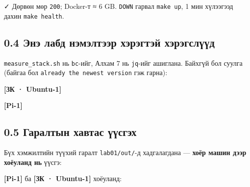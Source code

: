 ✓ Дөрвөн мөр \texttt{200}; Docker-т ≈ 6 GB. \texttt{DOWN} гарвал \texttt{make\ up}, 1 мин хүлээгээд дахин \texttt{make\ health}.

\hypertarget{ux44dux43dux44d-ux43bux430ux431ux434-ux43dux44dux43cux44dux43bux442ux44dux44dux440-ux445ux44dux440ux44dux433ux442ux44dux439-ux445ux44dux440ux44dux433ux441ux43bux4afux4afux434}{%
\subsection{0.4 Энэ лабд нэмэлтээр хэрэгтэй хэрэгслүүд}\label{ux44dux43dux44d-ux43bux430ux431ux434-ux43dux44dux43cux44dux43bux442ux44dux44dux440-ux445ux44dux440ux44dux433ux442ux44dux439-ux445ux44dux440ux44dux433ux441ux43bux4afux4afux434}}

\texttt{measure\_\allowbreak{}stack.\allowbreak{}sh} нь \texttt{bc}-ийг, Алхам 7 нь \texttt{jq}-ийг ашиглана. Байхгүй бол суулга (байгаа бол \texttt{already\ the\ newest\ version} гэж гарна):

\textbf{{[}ЗК · Ubuntu-1{]}}

\begin{Shaded}
\begin{Highlighting}[]
\end{Highlighting}
\end{Shaded}

\textbf{{[}Pi-1{]}}

\begin{Shaded}
\begin{Highlighting}[]
\end{Highlighting}
\end{Shaded}

\hypertarget{ux433ux430ux440ux430ux43bux442ux44bux43d-ux445ux430ux432ux442ux430ux441-ux4afux4afux441ux433ux44dux445}{%
\subsection{0.5 Гаралтын хавтас үүсгэх}\label{ux433ux430ux440ux430ux43bux442ux44bux43d-ux445ux430ux432ux442ux430ux441-ux4afux4afux441ux433ux44dux445}}

Бүх хэмжилтийн түүхий гаралт \texttt{lab01/out/}-д хадгалагдана --- \textbf{хоёр машин дээр хоёуланд нь} үүсгэ:

\textbf{{[}Pi-1{]}} ба \textbf{{[}ЗК · Ubuntu-1{]}} хоёуланд:

\begin{Shaded}
\begin{Highlighting}[]
\end{Highlighting}
\end{Shaded}

